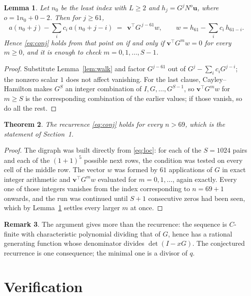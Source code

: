 \documentclass[11pt,a4paper]{article}
\theoremstyle{plain}
\newtheorem{theorem}{Theorem}
\newtheorem{lemma}[theorem]{Lemma}
\theoremstyle{definition}
\newtheorem{remark}[theorem]{Remark}
\begin{document}
\begin{lemma}\label{lem:crit}
Let $n_0$ be the least index with $L\ge2$ and $h_j=G^{j}N^{o}\mathbf{u}$, where
$o=1n_0+0-2$. Then for $j\ge61$,
\[
a(n_0+j)-\sum_i c_i\,a(n_0+j-i)\;=\;\,\mathbf{v}^{\!\top}G^{\,j-61}w,
\qquad w=h_{61}-\sum_i c_i\,h_{61-i} .
\]
Hence \eqref{eq:conj} holds from that point on if and only if
$\mathbf{v}^{\!\top}G^{m}w=0$ for every $m\ge0$, and it is enough to check
$m=0,1,\dots,S-1$.
\end{lemma}

\begin{proof}
Substitute Lemma~\ref{lem:walk} and factor $G^{j-61}$ out of
$G^{j}-\sum_ic_iG^{j-i}$; the nonzero scalar $1$ does not affect
vanishing. For the last clause, Cayley--Hamilton makes $G^{S}$ an integer combination of
$I,G,\dots,G^{S-1}$, so $\mathbf{v}^{\!\top}G^{m}w$ for $m\ge S$ is the corresponding
combination of the earlier values; if those vanish, so do all the rest.
\end{proof}

\begin{theorem}
The recurrence \eqref{eq:conj} holds for every $n>69$, which is the statement of
Section~1.
\end{theorem}

\begin{proof}
The digraph was built directly from \eqref{eq:loc}: for each of the $S=1024$ pairs and each
of the $(1+1)^{5}$ possible next rows, the condition was tested on every cell of
the middle row. The vector $w$ was formed by $61$ applications of $G$ in exact integer
arithmetic and $\mathbf{v}^{\!\top}G^{m}w$ evaluated for $m=0,1,\dots$, again exactly.
Every one of those integers vanishes from the index corresponding to $n=69+1$ onwards,
and the run was continued until $S+1$ consecutive zeros had been seen, which by
Lemma~\ref{lem:crit} settles every larger $m$ at once.
\end{proof}

\begin{remark}
The argument gives more than the recurrence: the sequence is $C$-finite with characteristic
polynomial dividing that of $G$, hence has a rational generating function whose denominator
divides $\det(I-xG)$. The conjectured recurrence is one consequence; the minimal one is a
divisor of $q$.
\end{remark}

\section{Verification}
\end{document}
